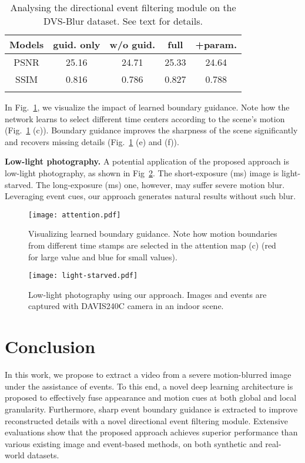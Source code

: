 \documentclass[10pt,twocolumn,letterpaper]{article}
\begin{document}
\begin{table}[t!]
	\centering
	\small
	\caption{Analysing the directional event filtering module on the DVS-Blur dataset. See text for details.}
	\begin{tabular}{ccccc}
		\toprule
		Models & guid. only & w/o guid. & full & +param. \\
		\midrule
		PSNR & 25.16 & 24.71 & 25.33 & 24.64 \\
		SSIM & 0.816 & 0.786 & 0.827 & 0.788 \\
		\bottomrule
		\label{tab:def}
	\end{tabular}
	\vspace{-10mm}
\end{table}

In Fig.~\ref{fig:attention}, we visualize the impact of learned boundary guidance. Note how the network learns to select different time centers according to the scene's motion (Fig.~\ref{fig:attention} (c)). Boundary guidance improves the sharpness of the scene significantly and recovers missing details (Fig.~\ref{fig:attention} (e) and (f)).

\textbf{Low-light photography.} A potential application of the proposed approach is low-light photography, as shown in Fig~\ref{fig:light-starved}. The short-exposure (ms) image is light-starved. The long-exposure (ms) one, however, may suffer severe motion blur. Leveraging event cues, our approach generates natural results without such blur.

\begin{figure}
	\centering
	\texttt{[image: attention.pdf]}
	\caption{Visualizing learned boundary guidance. Note how motion boundaries from different time stamps are selected in the attention map (c) (red for large value and blue for small values).} 
	\label{fig:attention}
	\vspace{-3mm}
\end{figure}

\begin{figure}[t!]
	\centering
	\texttt{[image: light-starved.pdf]}
	\caption{Low-light photography using our approach. Images and events are captured with DAVIS240C camera in an indoor scene.} 
	\label{fig:light-starved}
	\vspace{-5mm}
\end{figure}

\section{Conclusion}
In this work, we propose to extract a video from a severe motion-blurred image under the assistance of events. To this end, a novel deep learning architecture is proposed to effectively fuse appearance and motion cues at both global and local granularity. Furthermore, sharp event boundary guidance is extracted to improve reconstructed details with a novel directional event filtering module. Extensive evaluations show that the proposed approach achieves superior performance than various existing image and event-based methods, on both synthetic and real-world datasets.
\end{document}
